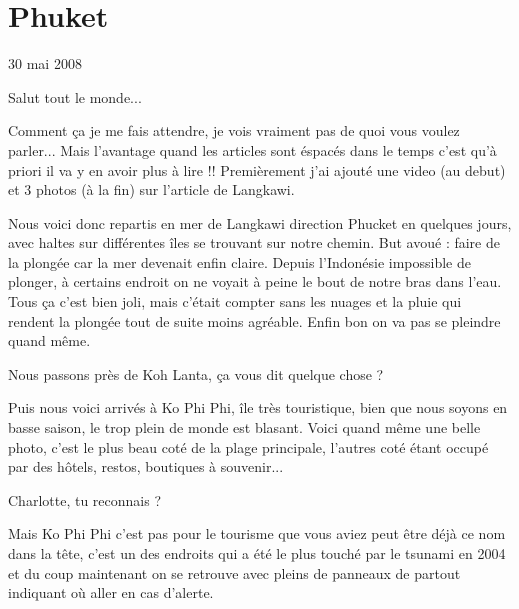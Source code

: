 \section{Phuket}

30 mai 2008

\begin{multicols}{2}

Salut tout le monde...

Comment ça je me fais attendre, je vois vraiment pas de quoi vous voulez parler... Mais l'avantage quand les articles sont éspacés dans le temps c'est qu'à priori il va y en avoir plus à lire !! Premièrement j'ai ajouté une video (au debut) et 3 photos (à la fin) sur l'article de Langkawi.

Nous voici donc repartis en mer de Langkawi direction Phucket en quelques jours, avec haltes sur différentes îles se trouvant sur notre chemin. But avoué : faire de la plongée car la mer devenait enfin claire. Depuis l'Indonésie impossible de plonger, à certains endroit on ne voyait à peine le bout de notre bras dans l'eau. Tous ça c'est bien joli, mais c'était compter sans les nuages et la pluie qui rendent la plongée tout de suite moins agréable. Enfin bon on va pas se pleindre quand même.

Nous passons près de Koh Lanta, ça vous dit quelque chose ?


Puis nous voici arrivés à Ko Phi Phi, île très touristique, bien que nous soyons en basse saison, le trop plein de monde est blasant. Voici quand même une belle photo, c'est le plus beau coté de la plage principale, l'autres coté étant occupé par des hôtels, restos, boutiques à souvenir...


Charlotte, tu reconnais ?

Mais Ko Phi Phi c'est pas pour le tourisme que vous aviez peut être déjà ce nom dans la tête, c'est un des endroits qui a été le plus touché par le tsunami en 2004 et du coup maintenant on se retrouve avec pleins de panneaux de partout indiquant où aller en cas d'alerte.


\end{multicols}
